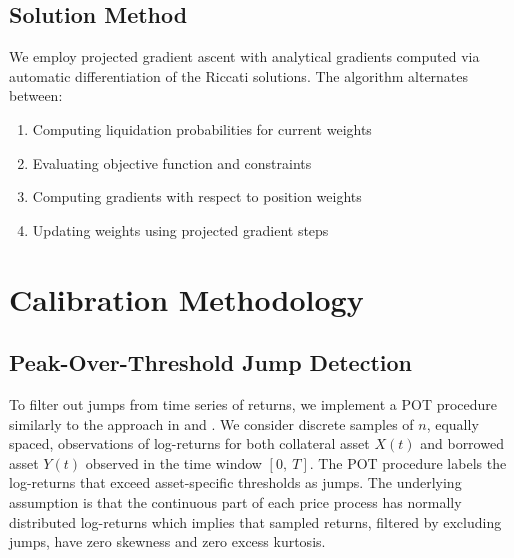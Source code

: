 \documentclass{article}
\theoremstyle{definition}
\begin{document}
\subsection{Solution Method}

We employ projected gradient ascent with analytical gradients computed via automatic differentiation of the Riccati solutions. The algorithm alternates between:
\begin{enumerate}
    \item Computing liquidation probabilities for current weights
    \item Evaluating objective function and constraints
    \item Computing gradients with respect to position weights
    \item Updating weights using projected gradient steps
\end{enumerate}

\section{Calibration Methodology}

\subsection{Peak-Over-Threshold Jump Detection}\label{sec:firststage}

To filter out jumps from time series of returns, we implement a POT procedure similarly to the approach in \cite{embrechts2011multivariate} and \cite[Chapter 4]{hainaut2022continuous}. We consider discrete samples of $n$, equally spaced, observations of log-returns for both collateral asset $X(t)$ and borrowed asset $Y(t)$ observed in the time window $[0,\ T]$.
The POT procedure labels the log-returns that exceed asset-specific thresholds as jumps. The underlying assumption is that the continuous part of each price process has normally distributed log-returns which implies that sampled returns, filtered by excluding jumps, have zero skewness and zero excess kurtosis.
\end{document}
